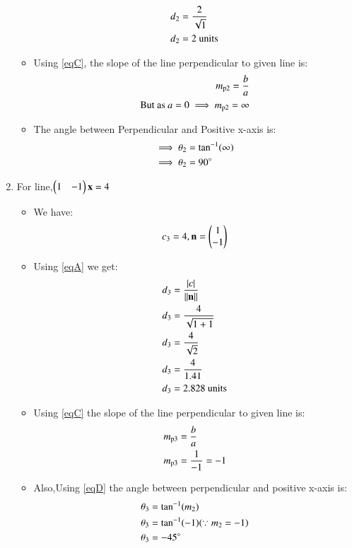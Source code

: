 \documentclass[journal,12pt,twocolumn]{IEEEtran}
\begin{document}
\begin{enumerate}
\begin{itemize}
\begin{align}
d\textsubscript{2}&=\frac{2}{\sqrt{1}} 
\\
d\textsubscript{2}&=2 \text{ units}
\end{align}
\item Using \eqref{eqC}, the slope of the line perpendicular to given line is:
\begin{align}
  m\textsubscript{p2}=\frac{b}{a}
  \\
\text{But as } a=0 \implies m\textsubscript{p2}=\infty
\end{align}
\item The angle between Perpendicular and Positive x-axis is:
 \begin{align}
 \implies \theta\textsubscript{2} &= \tan^{-1}(\infty)
  \\
 \implies \theta\textsubscript{2} &= 90\degree
\end{align}
\end{itemize}
\item For line,$\begin{pmatrix}1&-1\end{pmatrix}\mathbf{x} =4$
\begin{itemize}
\item We have:
\begin{align}
 c\textsubscript{3}=4 ,{\mathbf{n}}=\begin{pmatrix}1\\-1\end{pmatrix}   
\end{align}
\item Using \eqref{eqA} we get:
\begin{align}
d\textsubscript{3}&=\frac { \left| c \right| }{\lVert\mathbf{n}\rVert}
\\
d\textsubscript{3}&=\frac{4}{\sqrt{1+1}} 
\\
d\textsubscript{3}&=\frac{4}{\sqrt{2}}
\\
d\textsubscript{3}&=\frac{4}{1.41}
\\
d\textsubscript{3}&=2.828 \text{ units}
\end{align}
\item Using \eqref{eqC} the slope of the line perpendicular to given line is:
\begin{align}
  m\textsubscript{p3}&=\frac{b}{a}
  \\
  m\textsubscript{p3}&=\frac{1}{-1}=-1
\end{align}
 \item Also,Using \eqref{eqD} the angle between perpendicular and positive x-axis is:
 \begin{align}
  \theta\textsubscript{3} &= \tan^{-1}( m\textsubscript{2})
  \\
 \theta\textsubscript{3} &= \tan^{-1}(-1) (\because m\textsubscript{2}=-1)
 \\
 \theta\textsubscript{3} &= -45\degree
\end{align}
\end{itemize}


\end{enumerate}
\end{document}
